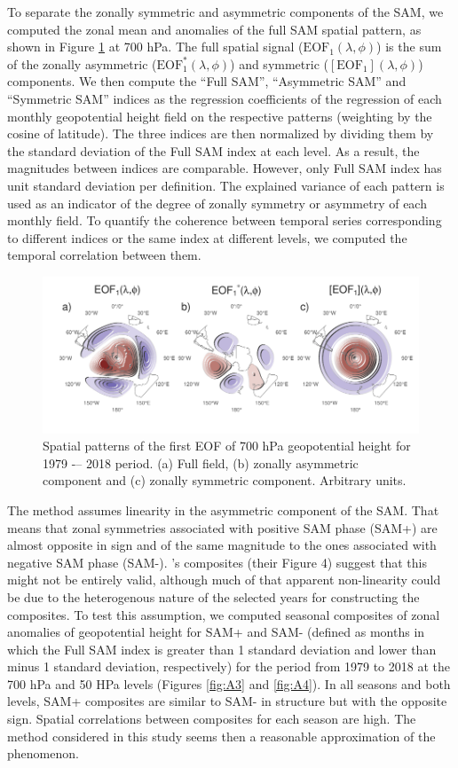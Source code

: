 \documentclass[smallextended]{svjour3}       %
\begin{document}
To separate the zonally symmetric and asymmetric components of the SAM, we computed the zonal mean and anomalies of the full SAM spatial pattern, as shown in Figure \ref{fig:method} at 700 hPa. The full spatial signal (\(\mathrm{EOF_1}(\lambda, \phi)\)) is the sum of the zonally asymmetric (\(\mathrm{EOF_1^*}(\lambda, \phi)\)) and symmetric (\([\mathrm{EOF_1}](\lambda, \phi)\)) components. We then compute the ``Full SAM'', ``Asymmetric SAM'' and ``Symmetric SAM'' indices as the regression coefficients of the regression of each monthly geopotential height field on the respective patterns (weighting by the cosine of latitude). The three indices are then normalized by dividing them by the standard deviation of the Full SAM index at each level. As a result, the magnitudes between indices are comparable. However, only Full SAM index has unit standard deviation per definition. The explained variance of each pattern is used as an indicator of the degree of zonally symmetry or asymmetry of each monthly field. To quantify the coherence between temporal series corresponding to different indices or the same index at different levels, we computed the temporal correlation between them.

\begin{figure}
\includegraphics{method-1} \caption{Spatial patterns of the first EOF of 700 hPa geopotential height for 1979 -– 2018 period. (a) Full field, (b) zonally asymmetric component and (c) zonally symmetric component. Arbitrary units.}\label{fig:method}
\end{figure}

The method assumes linearity in the asymmetric component of the SAM. That means that zonal symmetries associated with positive SAM phase (SAM+) are almost opposite in sign and of the same magnitude to the ones associated with negative SAM phase (SAM-). \citet{fogt2012}'s composites (their Figure 4) suggest that this might not be entirely valid, although much of that apparent non-linearity could be due to the heterogenous nature of the selected years for constructing the composites. To test this assumption, we computed seasonal composites of zonal anomalies of geopotential height for SAM+ and SAM- (defined as months in which the Full SAM index is greater than 1 standard deviation and lower than minus 1 standard deviation, respectively) for the period from 1979 to 2018 at the 700 hPa and 50 HPa levels (Figures \ref{fig:A3} and \ref{fig:A4}). In all seasons and both levels, SAM+ composites are similar to SAM- in structure but with the opposite sign. Spatial correlations between composites for each season are high. The method considered in this study seems then a reasonable approximation of the phenomenon.
\end{document}
